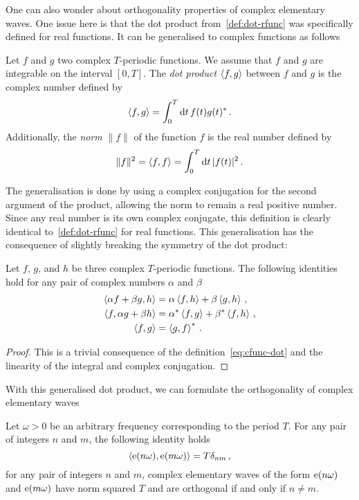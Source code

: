 One can also wonder about orthogonality properties of complex elementary waves. One issue
here is that the dot product from~\cref{def:dot-rfunc} was specifically defined for real
functions. It can be generalised to complex functions as follows
\begin{definition}
  Let $f$ and $g$ two complex $T$-periodic functions. We assume that $f$ and $g$ are
  integrable on the interval $[0,T]$. The \emph{dot product} $\braket{f,g}$ between $f$
  and $g$ is the complex number defined by
  \begin{equation}
    \braket{f,g}=\int_{0}^{T}\mathrm{d} t\, f(t)g(t)^*\,.\label{eq:cfunc-dot}
  \end{equation}
  Additionally, the \emph{norm} $\|f\|$ of the function $f$ is the real number defined by
  \begin{equation}
    \|f\|^2=\braket{f,f}=\int_{0}^{T}\mathrm{d} t\, |f(t)|^2\,.
  \end{equation}
\end{definition}
The generalisation is done by using a complex conjugation for the second argument of the
product, allowing the norm to remain a real positive number. Since any real number is its
own complex conjugate, this definition is clearly identical to~\cref{def:dot-rfunc} for
real functions. This generalisation has the consequence of slightly breaking the symmetry
of the dot product:
\begin{proposition}
  Let $f$, $g$, and $h$ be three complex $T$-periodic functions. The following identities
  hold for any pair of complex numbers $\alpha$ and $\beta$
  \begin{align}
    \braket{\alpha f+\beta g,h}&=\alpha\braket{f,h}+\beta\braket{g,h}\,,\\
    \braket{f,\alpha g+\beta h}&=\alpha^*\braket{f,g}+\beta^*\braket{f,h}\,,\\
    \braket{f,g}&=\braket{g,f}^*\,.
  \end{align}
\end{proposition}
\begin{proof}
  This is a trivial consequence of the definition~\cref{eq:cfunc-dot} and the linearity of
  the integral and complex conjugation.
\end{proof}
With this generalised dot product, we can formulate the orthogonality of complex
elementary waves
\begin{theorem}
  Let $\omega>0$ be an arbitrary frequency corresponding to the period $T$. For any pair
  of integers $n$ and $m$, the following identity holds
  \begin{equation}
    \braket{\mathrm{e}(n\omega),\mathrm{e}(m\omega)}=T\delta_{nm}\,,
  \end{equation}
  \ie for any pair of integers $n$ and $m$, complex elementary waves of the form
  $\mathrm{e}(n\omega)$ and $\mathrm{e}(m\omega)$ have norm squared $T$ and are orthogonal if and only
  if $n\neq m$.
\end{theorem}
